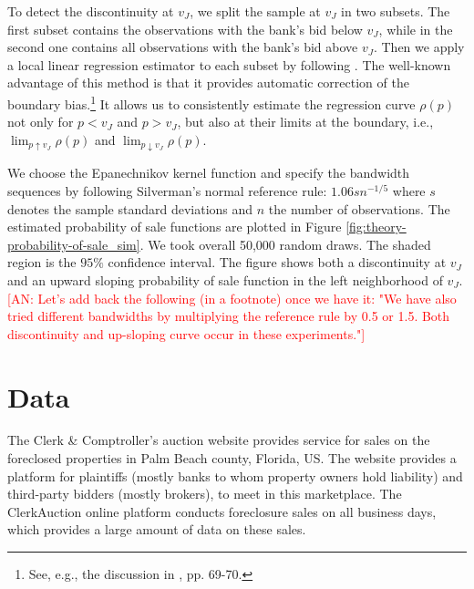 \documentclass[11pt,twopage]{article}
\newcommand{\AN}[1]{\textcolor{red}{[AN: #1]}}
\newcommand{\AS}[1]{\textcolor{blue}{[AS: #1]}}
\begin{document}

To detect the discontinuity at $v_J$, we split the sample at $v_J$ in two subsets. The first subset contains the observations with the bank's bid below $v_J$, while in the second one contains all observations with the bank's bid above $v_J$. Then we apply a local linear regression estimator to each subset by following \cite{fan1996local}. The well-known advantage of this method is that it provides automatic correction of the boundary bias.\footnote{See, e.g., the discussion in \cite{fan1996local}, pp. 69-70.} It allows us to consistently estimate the regression curve $\rho(p)$ not only for $p<v_J$ and $p>v_J$, but also at their limits at the boundary, i.e., $\lim_{p\uparrow v_J} \rho(p)$ and $\lim_{p\downarrow v_J} \rho(p)$. 

We choose the Epanechnikov kernel function and specify the bandwidth sequences by following Silverman's normal reference rule: $1.06sn^{-1/5}$ where $s$ denotes the sample standard deviations and $n$ the number of observations. The estimated probability of sale functions are plotted in Figure
\ref{fig:theory-probability-of-sale_sim}. We took overall 50,000 random draws. The shaded region is the $95\%$ confidence interval. 
The figure shows both a discontinuity at $v_J$ and an upward sloping probability of sale function in
the left neighborhood of $v_J$.\AN{Let's add back the following (in a footnote) once we have it:
"We have also tried different bandwidths by multiplying the
reference rule by 0.5 or 1.5. Both discontinuity and up-sloping curve occur in these experiments."}






\section{Data}
\label{sec:data}

The Clerk \& Comptroller's auction website provides service for sales
on the foreclosed properties in Palm Beach county, Florida, US. The
website provides a platform for plaintiffs (mostly banks to whom property
owners hold liability) and third-party bidders (mostly brokers), to meet
in this marketplace. The ClerkAuction online platform conducts
foreclosure sales on all business days, which provides a large amount
of data on these sales.
\end{document}
